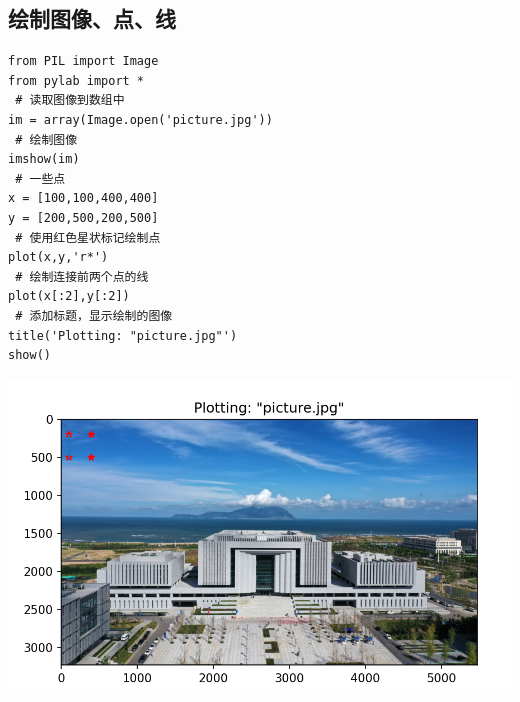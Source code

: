 \documentclass[UTF8,a4paper]{ctexart}
\begin{document}
\subsection{绘制图像、点、线}
\begin{lstlisting}
from PIL import Image
from pylab import *
 # 读取图像到数组中
im = array(Image.open('picture.jpg'))
 # 绘制图像
imshow(im)
 # 一些点
x = [100,100,400,400]
y = [200,500,200,500]
 # 使用红色星状标记绘制点
plot(x,y,'r*')
 # 绘制连接前两个点的线
plot(x[:2],y[:2])
 # 添加标题，显示绘制的图像
title('Plotting: "picture.jpg"')
show()
\end{lstlisting}
\includegraphics[width=1\textwidth]{./python/visual4.png}
\end{document}
